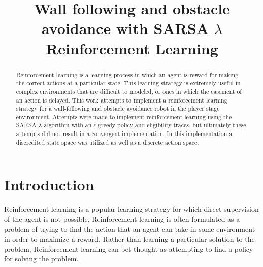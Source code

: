\documentclass[conference]{IEEEtran}
\begin{document}
%
\title{Wall following and obstacle avoidance with SARSA $\lambda$ Reinforcement Learning}


\author{
}



\maketitle


\begin{abstract}
\boldmath
Reinforcement learning is a learning process in which an agent is reward for making the correct actions at a particular state. 
This learning strategy is extremely useful in complex environments that are difficult to modeled, or ones in which the easement of an action is delayed.
This work attempts to implement a reinforcement learning strategy for a wall-following and obstacle avoidance robot in the player stage environment.
Attempts were made to implement reinforcement learning using the SARSA $\lambda$ algorithm with an $\epsilon$ greedy policy and eligibility traces, but ultimately these attempts did not result in a convergent implementation.
In this implementation a discredited state space was utilized as well as a discrete action space.
\end{abstract}
\IEEEpeerreviewmaketitle



\section{Introduction}

Reinforcement learning is a popular learning strategy for which direct supervision of the agent is not possible\cite{poliscuk_adaptive_2002,szepesvari_algorithms_2010}. 
Reinforcement learning is often formulated as a problem of trying to find the action that an agent can take in some environment in order to maximize a reward.
Rather than learning a particular solution to the problem, Reinforcement learning can bet thought as attempting to find a policy for solving the problem.  
\end{document}
